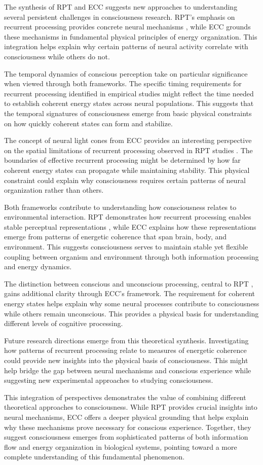 The synthesis of RPT and ECC suggests new approaches to understanding several persistent challenges in consciousness research. RPT's emphasis on recurrent processing provides concrete neural mechanisms \cite{Lamme2000}, while ECC grounds these mechanisms in fundamental physical principles of energy organization. This integration helps explain why certain patterns of neural activity correlate with consciousness while others do not.

The temporal dynamics of conscious perception take on particular significance when viewed through both frameworks. The specific timing requirements for recurrent processing identified in empirical studies \cite{Koivisto2010} might reflect the time needed to establish coherent energy states across neural populations. This suggests that the temporal signatures of consciousness emerge from basic physical constraints on how quickly coherent states can form and stabilize.

The concept of neural light cones from ECC provides an interesting perspective on the spatial limitations of recurrent processing observed in RPT studies \cite{Super2001}. The boundaries of effective recurrent processing might be determined by how far coherent energy states can propagate while maintaining stability. This physical constraint could explain why consciousness requires certain patterns of neural organization rather than others.

Both frameworks contribute to understanding how consciousness relates to environmental interaction. RPT demonstrates how recurrent processing enables stable perceptual representations \cite{Lamme2006}, while ECC explains how these representations emerge from patterns of energetic coherence that span brain, body, and environment. This suggests consciousness serves to maintain stable yet flexible coupling between organism and environment through both information processing and energy dynamics.

The distinction between conscious and unconscious processing, central to RPT \cite{Dehaene2006}, gains additional clarity through ECC's framework. The requirement for coherent energy states helps explain why some neural processes contribute to consciousness while others remain unconscious. This provides a physical basis for understanding different levels of cognitive processing.

Future research directions emerge from this theoretical synthesis. Investigating how patterns of recurrent processing relate to measures of energetic coherence could provide new insights into the physical basis of consciousness. This might help bridge the gap between neural mechanisms and conscious experience while suggesting new experimental approaches to studying consciousness.

This integration of perspectives demonstrates the value of combining different theoretical approaches to consciousness. While RPT provides crucial insights into neural mechanisms, ECC offers a deeper physical grounding that helps explain why these mechanisms prove necessary for conscious experience. Together, they suggest consciousness emerges from sophisticated patterns of both information flow and energy organization in biological systems, pointing toward a more complete understanding of this fundamental phenomenon.